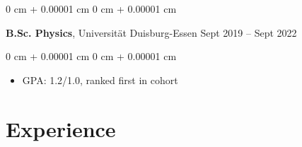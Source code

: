 \documentclass[10pt, letterpaper]{article}
\newenvironment{highlights}{
    \begin{itemize}[
        topsep=0.10 cm,
        parsep=0.10 cm,
        partopsep=0pt,
        itemsep=0pt,
        leftmargin=0 cm + 10pt
    ]
}{
    \end{itemize}
} %
\newenvironment{onecolentry}{
    \begin{adjustwidth}{
        0 cm + 0.00001 cm
    }{
        0 cm + 0.00001 cm
    }
}{
    \end{adjustwidth}
} %
\newenvironment{twocolentry}[2][]{
    \onecolentry
    \def\secondColumn{#2}
    \setcolumnwidth{\fill, 4.5 cm}
    \begin{paracol}{2}
}{
    \switchcolumn \raggedleft \secondColumn
    \end{paracol}
    \endonecolentry
} %
\begin{document}

        \vspace{0.2 cm}

        \begin{twocolentry}{
            Sept 2019 – Sept 2022
        }
            \textbf{B.Sc. Physics}, Universität Duisburg-Essen\end{twocolentry}

        \vspace{0.10 cm}
        \begin{onecolentry}
            \begin{highlights}
                \item GPA: 1.2/1.0, ranked first in cohort
            \end{highlights}
        \end{onecolentry}

    \section{Experience}









\end{document}
